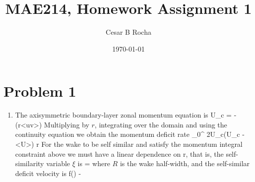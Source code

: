 \documentclass[11pt]{article}
\title{MAE214, Homework Assignment 1}
\author{Cesar B Rocha}
\date{\today}
\begin{document}


\maketitle

\section*{Problem 1}

\begin{enumerate}[label=(\alph*)]


    \item The axisymmetric boundary-layer zonal momentum equation is
        \beq
            \label{eq:axi_ble} 
            U_c  = - (r<uv>)\per
        \eeq
        Multiplying by $r$, integrating over the domain and using the continuity equation we obtain the momentum deficit rate
        \beq
          \int_{0}^{\infty} 2\pi \rho U_c(U_c - <U>) \dd r\per
        \eeq
        For the wake to be self similar and satisfy the momentum integral constraint above we must have a linear dependence on r, that is, the self-similarity variable $\xi$ is
        \beq
            \xi = \com
        \eeq
       where $R$ is the wake half-width, and the self-similar deficit velocity is
        \beq
             f(\xi) -  \per
        \eeq


\end{enumerate}
\end{document}
